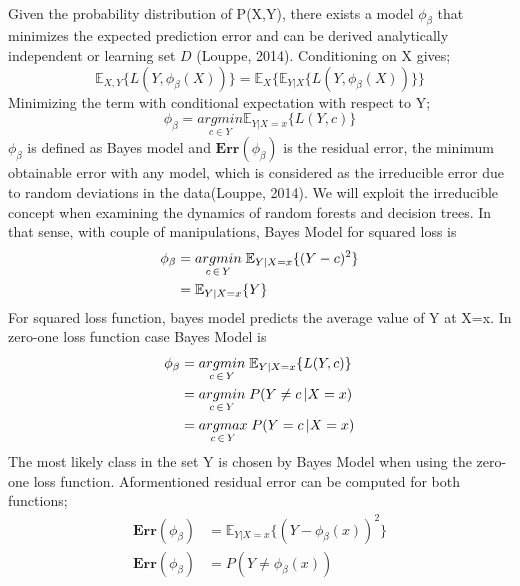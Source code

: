 \paragraph{}
Given the probability distribution of P(X,Y), there exists a model $\phi_{\beta}$ that minimizes the expected prediction error and can be derived analytically independent or learning set $D$ (Louppe, 2014). Conditioning on X gives;
\begin{equation}
\mathbb{E}_{X,Y} \{L(Y, \phi_{\beta}(X))\} = \mathbb{E}_{X}\{\mathbb{E}_{Y|X}\{L(Y, \phi_{\beta}(X)) \} \}
\end{equation}
Minimizing the term with conditional expectation with respect to Y;
\begin{equation}
\phi_{\beta} = \underset{c \in Y}{argmin} \mathbb{E}_{Y|X=x}\{L(Y,c)\}
\end{equation}
$\phi_{\beta}$ is defined as Bayes model and $\boldsymbol{Err}(\phi_{\beta})$ is the residual error, the minimum obtainable error with any model, which is considered as the irreducible error due to random deviations in the data(Louppe, 2014). We will exploit the irreducible concept when examining the dynamics of random forests and decision trees. In that sense, with couple of manipulations, Bayes Model for squared loss is
\begin{align}
\phi_{\beta} & = \underset{c \,\in\, Y}{argmin} \; \mathbb{E}_{Y|X=x}\{(Y-c)^2 \} \notag\\
			 & = \mathbb{E}_{Y|X=x}\{Y\}
\end{align}
For squared loss function, bayes model predicts the average value of Y at X=x. In zero-one loss function case Bayes Model is
\begin{align}
\phi_{\beta} & = \underset{c \,\in\, Y}{argmin} \; \mathbb{E}_{Y|X=x}\{L(Y,c) \} \notag\\
			 & = \underset{c \,\in\, Y}{argmin} \; P(Y \neq c \,| X = x) \notag\\
			 & = \underset{c \,\in\, Y}{argmax} \; P(Y = c \,| X = x)
\end{align}
The most likely class in the set Y is chosen by Bayes Model when using the zero-one loss function. Aformentioned residual error can be computed for both functions;
\begin{align}
\boldsymbol{Err}(\phi_{\beta}) & = \mathbb{E}_{Y|X=x}\{(Y-\phi_{\beta}(x))^2 \}\\
\boldsymbol{Err}(\phi_{\beta}) & = P(Y \neq \phi_{\beta}(x) )
\end{align}

